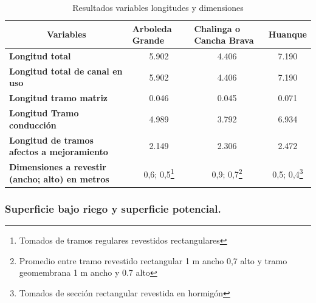 \documentclass[]{article}
\let\rmarkdownfootnote\footnote%
\def\footnote{\protect\rmarkdownfootnote}
\begin{document}
\begin{longtable}{|l|ccc|}
\caption{Resultados variables longitudes y dimensiones}\\
\hline
\multicolumn{1}{|c|}{\textbf{Variables}}                 & \multicolumn{1}{l}{\textbf{Arboleda Grande}} & \multicolumn{1}{l}{\textbf{Chalinga o Cancha Brava}} & \multicolumn{1}{l|}{\textbf{Huanque}} \\ \hline
\textbf{Longitud total}                                  & 5.902                                        & 4.406                                                & 7.190                                 \\
\textbf{Longitud total de canal en uso}                  & 5.902                                        & 4.406                                                & 7.190                                 \\
\textbf{Longitud tramo matriz}                           & 0.046                                        & 0.045                                                & 0.071                                 \\
\textbf{Longitud Tramo conducción}                       & 4.989                                        & 3.792                                                & 6.934                                 \\
\textbf{Longitud de tramos afectos a mejoramiento}       & 2.149                                        & 2.306                                                & 2.472                                 \\
\textbf{Dimensiones a revestir  (ancho; alto) en metros} & 0,6; 0,5\footnote{Tomados de tramos regulares revestidos rectangulares}                                    & 0,9; 0,7\footnote{Promedio entre tramo revestido rectangular 1 m ancho 0,7 alto y tramo geomembrana 1 m ancho y 0.7 alto}                                          & 0,5; 0,4\footnote{Tomados de sección rectangular revestida en hormigón }                           \\ 
\hline
\end{longtable}%





\subsubsection{Superficie bajo riego y superficie potencial.}
\end{document}

